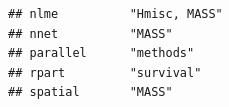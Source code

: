 \documentclass[]{article}
\begin{document}
\begin{verbatim}
## nlme          "Hmisc, MASS"                                                                                                                                                                                                                                                                                                                                                                                                                                                                                                                                                                             
## nnet          "MASS"                                                                                                                                                                                                                                                                                                                                                                                                                                                                                                                                                                                    
## parallel      "methods"                                                                                                                                                                                                                                                                                                                                                                                                                                                                                                                                                                                 
## rpart         "survival"                                                                                                                                                                                                                                                                                                                                                                                                                                                                                                                                                                                
## spatial       "MASS"                                                                                                                                                                                                                                                                                                                                                                                                                                                                                                                                                                                    

\end{verbatim}
\end{document}
